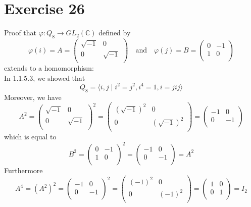 \documentclass[12pt]{article}
\newcommand{\C}{\mathbb{C}}
\begin{document}
    \section*{Exercise 26}
    Proof that $\varphi: Q_8 \to GL_2(\C)$ defined by
    \[  \varphi(i) = A =\begin{pmatrix}
        \sqrt{-1} & 0 \\
        0 & \sqrt{-1} \\
    \end{pmatrix}
    \quad \text{and} \quad
    \varphi(j) = B =\begin{pmatrix}
        0 & -1 \\
        1 & 0 \\
    \end{pmatrix} \]
    extends to a homomorphism: \\
    In 1.1.5.3, we showed that
    \[  Q_8 = \langle i, j \mid i^2 = j^2, i^4 = 1, i = jij \rangle \]
    Moreover, we have
    \[  A^2 = \begin{pmatrix}
        \sqrt{-1} & 0 \\
        0 & \sqrt{-1} \\
    \end{pmatrix}^2
    = \begin{pmatrix}
        (\sqrt{-1})^2 & 0 \\
        0 & (\sqrt{-1})^2 \\
    \end{pmatrix}
    = \begin{pmatrix}
        -1 & 0 \\
        0 & -1 \\
    \end{pmatrix} \]
    which is equal to
    \[  B^2 = \begin{pmatrix}
        0 & -1 \\
        1 & 0 \\
    \end{pmatrix}^2
    = \begin{pmatrix}
        -1 & 0 \\
        0 & -1 \\
    \end{pmatrix} = A^2 \]
    Furthermore
    \[  A^4 = (A^2)^2 = \begin{pmatrix}
        -1 & 0 \\
        0 & -1 \\
    \end{pmatrix}^2
    = \begin{pmatrix}
        (-1)^2 & 0 \\
        0 & (-1)^2 \\
    \end{pmatrix}
    = \begin{pmatrix}
        1 & 0 \\
        0 & 1 \\
    \end{pmatrix} = I_2 \]
\end{document}
